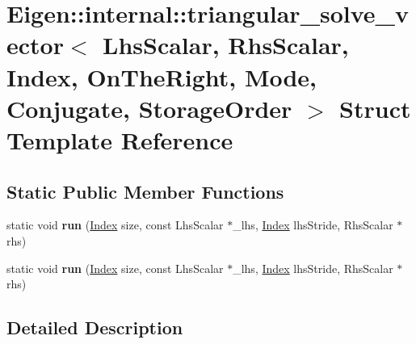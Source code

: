 \hypertarget{struct_eigen_1_1internal_1_1triangular__solve__vector_3_01_lhs_scalar_00_01_rhs_scalar_00_01_ind2257c92bae887c34b8b6b704148c0908}{}\section{Eigen\+:\+:internal\+:\+:triangular\+\_\+solve\+\_\+vector$<$ Lhs\+Scalar, Rhs\+Scalar, Index, On\+The\+Right, Mode, Conjugate, Storage\+Order $>$ Struct Template Reference}
\label{struct_eigen_1_1internal_1_1triangular__solve__vector_3_01_lhs_scalar_00_01_rhs_scalar_00_01_ind2257c92bae887c34b8b6b704148c0908}
\subsection*{Static Public Member Functions}
\begin{DoxyCompactItemize}
\item 
\mbox{\label{struct_eigen_1_1internal_1_1triangular__solve__vector_3_01_lhs_scalar_00_01_rhs_scalar_00_01_ind2257c92bae887c34b8b6b704148c0908_a677f09401393e22374f252697fea0a6b}} 
static void {\bfseries run} (\hyperlink{namespace_eigen_a62e77e0933482dafde8fe197d9a2cfde}{Index} size, const Lhs\+Scalar $\ast$\+\_\+lhs, \hyperlink{namespace_eigen_a62e77e0933482dafde8fe197d9a2cfde}{Index} lhs\+Stride, Rhs\+Scalar $\ast$rhs)
\item 
\mbox{\label{struct_eigen_1_1internal_1_1triangular__solve__vector_3_01_lhs_scalar_00_01_rhs_scalar_00_01_ind2257c92bae887c34b8b6b704148c0908_a677f09401393e22374f252697fea0a6b}} 
static void {\bfseries run} (\hyperlink{namespace_eigen_a62e77e0933482dafde8fe197d9a2cfde}{Index} size, const Lhs\+Scalar $\ast$\+\_\+lhs, \hyperlink{namespace_eigen_a62e77e0933482dafde8fe197d9a2cfde}{Index} lhs\+Stride, Rhs\+Scalar $\ast$rhs)
\end{DoxyCompactItemize}


\subsection{Detailed Description}
